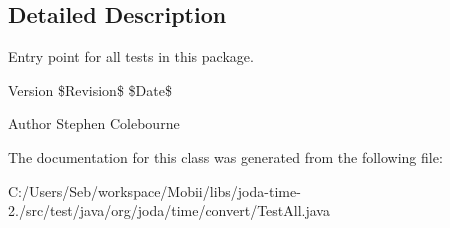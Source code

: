 \subsection{Detailed Description}
Entry point for all tests in this package.

\begin{DoxyVersion}{Version}
\$\-Revision\$ \$\-Date\$
\end{DoxyVersion}
\begin{DoxyAuthor}{Author}
Stephen Colebourne 
\end{DoxyAuthor}


The documentation for this class was generated from the following file\-:\begin{DoxyCompactItemize}
\item 
C\-:/\-Users/\-Seb/workspace/\-Mobii/libs/joda-\/time-\/2./src/test/java/org/joda/time/convert/Test\-All.\-java\end{DoxyCompactItemize}
